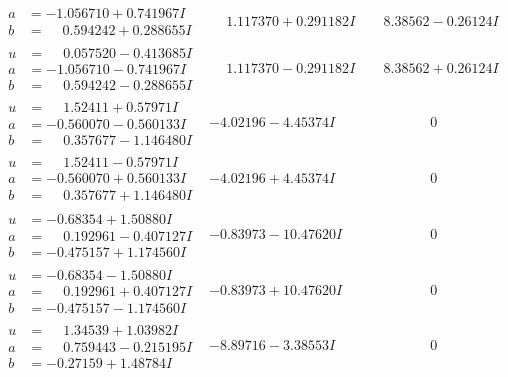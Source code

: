 \documentclass[1p]{elsarticle_modified}
\theoremstyle{definition}
\begin{document}
$$\begin{array}{c|c|c}
\begin{aligned}
a &= -1.056710 + 0.741967 I \\
b &= \phantom{-}0.594242 + 0.288655 I\end{aligned}
 & \phantom{-}1.117370 + 0.291182 I & \phantom{-}8.38562 - 0.26124 I \\ \hline\begin{aligned}
u &= \phantom{-}0.057520 - 0.413685 I \\
a &= -1.056710 - 0.741967 I \\
b &= \phantom{-}0.594242 - 0.288655 I\end{aligned}
 & \phantom{-}1.117370 - 0.291182 I & \phantom{-}8.38562 + 0.26124 I \\ \hline\begin{aligned}
u &= \phantom{-}1.52411 + 0.57971 I \\
a &= -0.560070 - 0.560133 I \\
b &= \phantom{-}0.357677 - 1.146480 I\end{aligned}
 & -4.02196 - 4.45374 I & \phantom{-0.000000 } 0 \\ \hline\begin{aligned}
u &= \phantom{-}1.52411 - 0.57971 I \\
a &= -0.560070 + 0.560133 I \\
b &= \phantom{-}0.357677 + 1.146480 I\end{aligned}
 & -4.02196 + 4.45374 I & \phantom{-0.000000 } 0 \\ \hline\begin{aligned}
u &= -0.68354 + 1.50880 I \\
a &= \phantom{-}0.192961 - 0.407127 I \\
b &= -0.475157 + 1.174560 I\end{aligned}
 & -0.83973 - 10.47620 I & \phantom{-0.000000 } 0 \\ \hline\begin{aligned}
u &= -0.68354 - 1.50880 I \\
a &= \phantom{-}0.192961 + 0.407127 I \\
b &= -0.475157 - 1.174560 I\end{aligned}
 & -0.83973 + 10.47620 I & \phantom{-0.000000 } 0 \\ \hline\begin{aligned}
u &= \phantom{-}1.34539 + 1.03982 I \\
a &= \phantom{-}0.759443 - 0.215195 I \\
b &= -0.27159 + 1.48784 I\end{aligned}
 & -8.89716 - 3.38553 I & \phantom{-0.000000 } 0 \\ \hline\begin{aligned}

\end{aligned}
\end{array}$$
\end{document}
